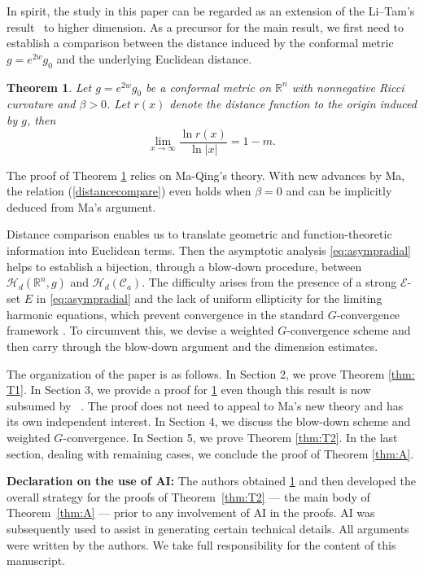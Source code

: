 \documentclass[10pt,a4paper]{amsart}
\newtheorem{theorem}{Theorem}[section]
\numberwithin{equation}{section}
\begin{document}
In spirit, the study in this paper can be regarded as an extension of the Li--Tam's result~\cite{LT2} to higher dimension. As a precursor for the main result, we first need to  establish a comparison between  the distance induced by the conformal metric $g=e^{2w}g_0$ and the underlying Euclidean distance.

\begin{theorem} \label{thm:distance}
Let $g=e^{2w} g_0$ be a conformal metric on $\mathbb{R}^n$ with nonnegative Ricci curvature and $\beta>0$. Let $r(x)$ denote the distance function to the origin induced by $g$, then
\begin{equation} \label{distancecompare}
\lim_{x\to \infty} \frac{\ln r(x)}{\ln |x|}=1-m. 
 \end{equation} 
\end{theorem}

The proof of Theorem \ref{thm:distance} relies on Ma-Qing's theory. With new advances by Ma, the relation (\ref{distancecompare}) even holds when $\beta=0$ and can be implicitly deduced from Ma's argument. 

{Distance comparison enables us to translate geometric and function-theoretic information into Euclidean terms. Then the asymptotic analysis \cref{eq:asympradial} helps to establish a bijection, through a blow-down procedure,
between $\mathcal{H}_d(\mathbb{R}^n, g)$ and $\mathcal{H}_{d}(\mathcal{C}_a)$.
The difficulty arises from the presence of a strong $\mathcal{E}$-set $E$ in \cref{eq:asympradial} and the lack of uniform ellipticity for the limiting harmonic equations, which prevent convergence in the standard $G$-convergence framework \cite{ZKON}. To circumvent this, we devise a weighted $G$-convergence scheme and then carry through the blow-down argument and the dimension estimates.}

The organization of the paper is as follows. In Section 2, we prove Theorem \ref{thm: T1}. In Section 3, we provide a proof for \cref{thm:distance} even though this result is now subsumed by ~\cite{M}. The proof does not need to appeal to Ma's new theory and has its own independent interest. In Section 4, we discuss the blow-down scheme and weighted $G$-convergence. In Section 5, we prove Theorem \ref{thm:T2}. In the last section, dealing with remaining cases, we conclude the proof of Theorem \ref{thm:A}.

{\bf Declaration on the use of AI:}
The authors  obtained \cref{thm:distance} and then developed the overall strategy for the proofs of Theorem~\ref{thm:T2} 
---
the main body of Theorem~\ref{thm:A}
---
prior to any involvement of AI in the proofs.
AI was subsequently used to assist in generating certain technical details.
All arguments were written by the authors.
We take full responsibility  for the content of this manuscript.
\end{document}
